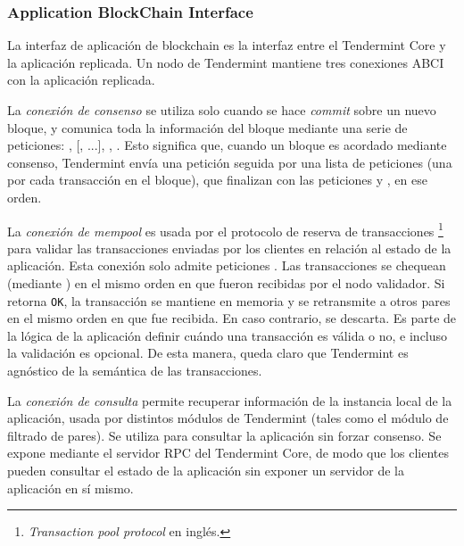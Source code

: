 \subsubsection{Application BlockChain Interface}\label{subsec:abci}
La interfaz de aplicación de blockchain es la interfaz entre el Tendermint Core y la aplicación replicada.
%
Un nodo de Tendermint mantiene tres conexiones ABCI con la aplicación replicada.
%

La \textit{conexión de consenso} se utiliza solo cuando se hace \textit{commit} sobre un nuevo bloque,
y comunica toda la información del bloque mediante una serie de peticiones: 
\BeginBlock, [\DeliverTx, ...], \EndBlock, \Commit.
%
Esto significa que, cuando un bloque es acordado mediante consenso, Tendermint envía una petición \BeginBlock
seguida por una lista de peticiones \DeliverTx (una por cada transacción en el bloque), que finalizan con las
peticiones \EndBlock y \Commit, en ese orden.

%

La \textit{conexión de mempool} es usada por el protocolo de reserva de transacciones \footnote{\textit{Transaction pool protocol}
en inglés.} para validar las transacciones enviadas por los clientes en relación al estado de la aplicación.
%
Esta conexión solo admite peticiones \CheckTx. Las transacciones se chequean (mediante \CheckTx) en el mismo orden
en que fueron recibidas por el nodo validador.
%
Si \CheckTx retorna \texttt{OK}, la transacción se mantiene en memoria y se retransmite a otros pares en el mismo orden
en que fue recibida.
%
En caso contrario, se descarta.
%
Es parte de la lógica de la aplicación definir cuándo una transacción es válida o no, e incluso la validación es opcional.
%
De esta manera, queda claro que Tendermint es agnóstico de la semántica de las transacciones.

%

La \textit{conexión de consulta} permite recuperar información de la instancia local de la aplicación, usada
por distintos módulos de Tendermint (tales como el módulo de filtrado de pares).
%
Se utiliza para consultar la aplicación sin forzar consenso.
%
Se expone mediante el servidor RPC del Tendermint Core, de modo que los clientes pueden
consultar el estado de la aplicación sin exponer un servidor de la aplicación en sí mismo. 

